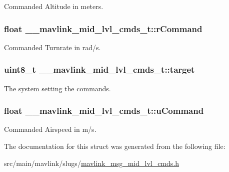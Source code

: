 Commanded Altitude in meters. 

\hypertarget{struct____mavlink__mid__lvl__cmds__t_a878c166fd170d7331278a565501fcd4e}{
\subsubsection[{r\+Command}]{\setlength{\rightskip}{0pt plus 5cm}float \+\_\+\+\_\+mavlink\+\_\+mid\+\_\+lvl\+\_\+cmds\+\_\+t\+::r\+Command}}\label{struct____mavlink__mid__lvl__cmds__t_a878c166fd170d7331278a565501fcd4e}


Commanded Turnrate in rad/s. 

\hypertarget{struct____mavlink__mid__lvl__cmds__t_ab0acf8785fcc93f84eb98fdc6bd5b139}{
\subsubsection[{target}]{\setlength{\rightskip}{0pt plus 5cm}uint8\+\_\+t \+\_\+\+\_\+mavlink\+\_\+mid\+\_\+lvl\+\_\+cmds\+\_\+t\+::target}}\label{struct____mavlink__mid__lvl__cmds__t_ab0acf8785fcc93f84eb98fdc6bd5b139}


The system setting the commands. 

\hypertarget{struct____mavlink__mid__lvl__cmds__t_a600a326520b65909e7e10e81176de477}{
\subsubsection[{u\+Command}]{\setlength{\rightskip}{0pt plus 5cm}float \+\_\+\+\_\+mavlink\+\_\+mid\+\_\+lvl\+\_\+cmds\+\_\+t\+::u\+Command}}\label{struct____mavlink__mid__lvl__cmds__t_a600a326520b65909e7e10e81176de477}


Commanded Airspeed in m/s. 



The documentation for this struct was generated from the following file\+:\begin{DoxyCompactItemize}
\item 
src/main/mavlink/slugs/\hyperlink{mavlink__msg__mid__lvl__cmds_8h}{mavlink\+\_\+msg\+\_\+mid\+\_\+lvl\+\_\+cmds.\+h}\end{DoxyCompactItemize}
